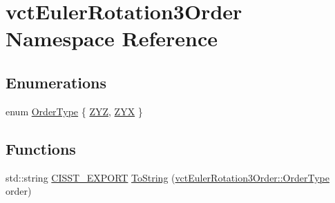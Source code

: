 \hypertarget{namespacevct_euler_rotation3_order}{\section{vct\-Euler\-Rotation3\-Order Namespace Reference}
\label{namespacevct_euler_rotation3_order}
}
\subsection*{Enumerations}
\begin{DoxyCompactItemize}
\item 
enum \hyperlink{namespacevct_euler_rotation3_order_ac67e18ebf7cf8c53e5578514bff3efbb}{Order\-Type} \{ \hyperlink{namespacevct_euler_rotation3_order_ac67e18ebf7cf8c53e5578514bff3efbba6f3f3ac8f74e487e6a675b92e23f0740}{Z\-Y\-Z}, 
\hyperlink{namespacevct_euler_rotation3_order_ac67e18ebf7cf8c53e5578514bff3efbba2f5ff20db4a15ce6c11c9815870407f2}{Z\-Y\-X}
 \}
\end{DoxyCompactItemize}
\subsection*{Functions}
\begin{DoxyCompactItemize}
\item 
std\-::string \hyperlink{cmn_export_macros_8h_a99393e0c3ac434b2605235bbe20684f8}{C\-I\-S\-S\-T\-\_\-\-E\-X\-P\-O\-R\-T} \hyperlink{namespacevct_euler_rotation3_order_ac41dd520659446ebfdaf60abdea0a2de}{To\-String} (\hyperlink{namespacevct_euler_rotation3_order_ac67e18ebf7cf8c53e5578514bff3efbb}{vct\-Euler\-Rotation3\-Order\-::\-Order\-Type} order)
\end{DoxyCompactItemize}



